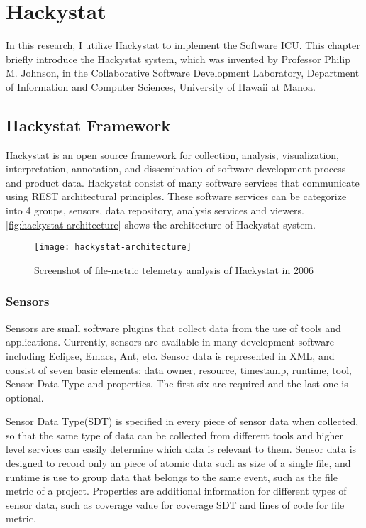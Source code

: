 \chapter{Hackystat}
In this research, I utilize Hackystat to implement the Software ICU. This chapter briefly introduce the Hackystat system, which was invented by Professor Philip M. Johnson, in the Collaborative Software Development Laboratory, Department of Information and Computer Sciences, University of Hawaii at Manoa. 
 
\section{Hackystat Framework}
Hackystat is an open source framework for collection, analysis, visualization, interpretation, annotation, and dissemination of software development process and product data. Hackystat consist of many software services that communicate using REST architectural principles\cite{rest}. These software services can be categorize into 4 groups, sensors, data repository, analysis services and viewers. \autoref{fig:hackystat-architecture} shows the architecture of Hackystat system. 

\begin{figure}[htbp]
   \centering
   \texttt{[image: hackystat-architecture]} 
   \caption{Screenshot of file-metric telemetry analysis of Hackystat in 2006}
   \label{fig:hackystat-architecture}
\end{figure}

\subsection{Sensors}
Sensors are small software plugins that collect data from the use of tools and applications. Currently, sensors are available in many development software including Eclipse, Emacs, Ant, etc. Sensor data is represented in XML, and consist of seven basic elements: data owner, resource, timestamp, runtime, tool, Sensor Data Type and properties. The first six are required and the last one is optional. 

Sensor Data Type(SDT) is specified in every piece of sensor data when collected, so that the same type of data can be collected from different tools and higher level services can easily determine which data is relevant to them. Sensor data is designed to record only an piece of atomic data such as size of a single file, and runtime is use to group data that belongs to the same event, such as the file metric of a project. Properties are additional information for different types of sensor data, such as coverage value for coverage SDT and lines of code for file metric. 

